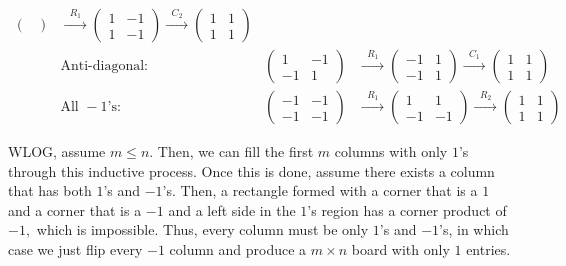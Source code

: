 \documentclass[12pt]{article}
\begin{document}
\begin{enumerate}
\begin{enumerate}
\begin{align*}
\begin{pmatrix}
          \end{pmatrix}
          &\xrightarrow{\;\;R_1\;\;}
          \begin{pmatrix} 1 & -1 \\ 1 & -1
          \end{pmatrix}
          \xrightarrow{\;\;C_2\;\;}
          \begin{pmatrix} 1 & 1 \\ 1 & 1
          \end{pmatrix} \\[6pt]
          &\text{Anti-diagonal:} &
          \begin{pmatrix} 1 & -1 \\ -1 & 1
          \end{pmatrix}
          &\xrightarrow{\;\;R_1\;\;}
          \begin{pmatrix} -1 & 1 \\ -1 & 1
          \end{pmatrix}
          \xrightarrow{\;\;C_1\;\;}
          \begin{pmatrix} 1 & 1 \\ 1 & 1
          \end{pmatrix} \\[6pt]
          &\text{All } -1\text{'s:} &
          \begin{pmatrix} -1 & -1 \\ -1 & -1
          \end{pmatrix}
          &\xrightarrow{\;\;R_1\;\;}
          \begin{pmatrix} 1 & 1 \\ -1 & -1
          \end{pmatrix}
          \xrightarrow{\;\;R_2\;\;}
          \begin{pmatrix} 1 & 1 \\ 1 & 1
          \end{pmatrix}
        \end{align*}
    \end{enumerate}

    WLOG, assume $m \leq n.$ Then, we can fill the first $m$ columns
    with only $1$'s through this inductive process. Once this is
    done, assume there exists a column that has both $1$'s and
    $-1$'s. Then, a rectangle formed with a corner that is a $1$ and
    a corner that is a $-1$ and a left side in the $1$'s region has a
    corner product of $-1,$ which is impossible. Thus, every column
    must be only $1$'s and $-1$'s, in which case we just flip every
    $-1$ column and produce a $m \times n$ board with only $1$ entries.


\end{enumerate}
\end{document}
